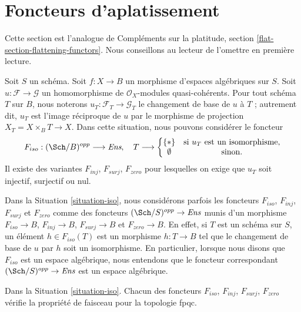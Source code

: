 \section{Foncteurs d'aplatissement}
\label{section-F-zero}

\noindent
Cette section est l'analogue de
Compléments sur la platitude, section \ref{flat-section-flattening-functors}.
Nous conseillons au lecteur de l'omettre en première lecture.

\begin{situation}
\label{situation-iso}
Soit $S$ un schéma.
Soit $f : X \to B$ un morphisme d'espaces algébriques sur $S$.
Soit $u : \mathcal{F} \to \mathcal{G}$ un homomorphisme de
$\mathcal{O}_X$-modules quasi-cohérents. Pour tout schéma $T$ sur
$B$, nous noterons $u_T : \mathcal{F}_T \to \mathcal{G}_T$ le
changement de base de $u$ à $T$ ; autrement dit, $u_T$ est l'image réciproque
de $u$ par le morphisme de projection $X_T = X \times_B T \to X$.
Dans cette situation, nous pouvons considérer le foncteur
\begin{equation}
\label{equation-iso}
F_{iso} : (\Sch/B)^{opp} \longrightarrow \textit{Ens}, \quad
T \longrightarrow \left\{
\begin{matrix}
\{*\} & \text{si }u_T\text{ est un isomorphisme}, \\
\emptyset & \text{sinon.}
\end{matrix}
\right.
\end{equation}
Il existe des variantes $F_{inj}$, $F_{surj}$, $F_{zero}$ pour lesquelles on exige que
$u_T$ soit injectif, surjectif ou nul.
\end{situation}

\noindent
Dans la Situation \ref{situation-iso}, nous considérons parfois les foncteurs
$F_{iso}$, $F_{inj}$, $F_{surj}$ et $F_{zero}$ comme des foncteurs
$(\Sch/S)^{opp} \to \textit{Ens}$ munis d'un morphisme
$F_{iso} \to B$, $F_{inj} \to B$, $F_{surj} \to B$ et $F_{zero} \to B$.
En effet, si $T$ est un schéma sur $S$, un élément $h \in F_{iso}(T)$
est un morphisme $h : T \to B$
tel que le changement de base de $u$ par $h$ soit un isomorphisme.
En particulier, lorsque nous disons
que $F_{iso}$ est un espace algébrique, nous entendons que le foncteur
correspondant $(\Sch/S)^{opp} \to \textit{Ens}$ est un espace algébrique.

\begin{lemma}
\label{lemma-iso-sheaf}
Dans la Situation \ref{situation-iso}.
Chacun des foncteurs $F_{iso}$, $F_{inj}$, $F_{surj}$, $F_{zero}$
vérifie la propriété de faisceau pour la topologie fpqc.
\end{lemma}

